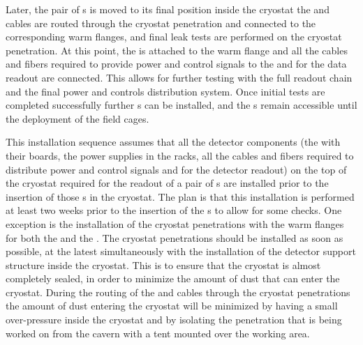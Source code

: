 Later, the pair of s is moved to its final position 
inside the cryostat the 
and  cables are routed through the cryostat penetration and
connected to the corresponding warm flanges, and final leak tests are performed
on the cryostat penetration. At this point, the  is attached
to the warm flange and all the cables and fibers required to provide 
power and control signals to the  and for the data
readout are connected. This allows for further testing with the full 
 readout chain and the final power and controls distribution
system. Once initial tests are completed successfully further s
can be installed, and the s remain accessible until the 
deployment of the field cages.

This installation sequence assumes that all the  detector 
components (the  with their boards, the power supplies in 
the racks, all the cables and fibers required to distribute power and
control signals and for the detector readout) on the top of the cryostat 
required for the readout of a pair of s are installed prior 
to the insertion of those s in the cryostat. The plan is 
that this installation is performed at least two weeks prior to the 
insertion of the s to allow for some checks. One exception
is the installation of the cryostat penetrations with the warm flanges
for both the  and the . The cryostat
penetrations should be installed as soon as possible, at the latest
simultaneously with the installation of the detector support structure
inside the cryostat. This is to ensure that the cryostat is almost 
completely sealed, in order to minimize the amount of dust that can 
enter the cryostat. During the routing of the  and
 cables through the cryostat penetrations the amount
of dust entering the cryostat will be minimized by having a small
over-pressure inside the cryostat and by isolating the penetration
that is being worked on from the cavern with a tent mounted over 
the working area.

